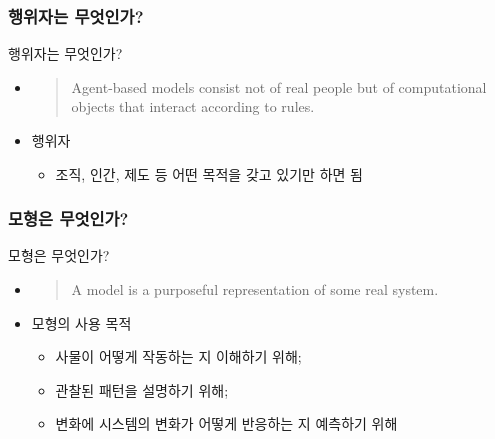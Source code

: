 \documentclass[hyperref={unicode}]{beamer}
\begin{document}
\subsubsection*{행위자는 무엇인가?}
\begin{frame}{행위자는 무엇인가?}
\begin{itemize}
\item \cite{Page:2008aa}
	\begin{quote}
	Agent-based models consist not of real people but of computational objects that interact according to rules.
	\end{quote}
\item 행위자
	\begin{itemize}
	\item 조직, 인간, 제도 등 어떤 목적을 갖고 있기만 하면 됨
	\end{itemize}
\end{itemize}	
\end{frame}

\subsubsection*{모형은 무엇인가?}
\begin{frame}{모형은 무엇인가?}
\begin{itemize}
\item \cite{Starfield:1990aa}
	\begin{quote}
	A model is a purposeful representation of some real system.
	\end{quote}
\item 모형의 사용 목적
	\begin{itemize}
	\item 사물이 어떻게 작동하는 지 이해하기 위해;
	\item 관찰된 패턴을 설명하기 위해;
	\item 변화에 시스템의 변화가 어떻게 반응하는 지 예측하기 위해
	\end{itemize}
\end{itemize}
\end{frame}
\end{document}
